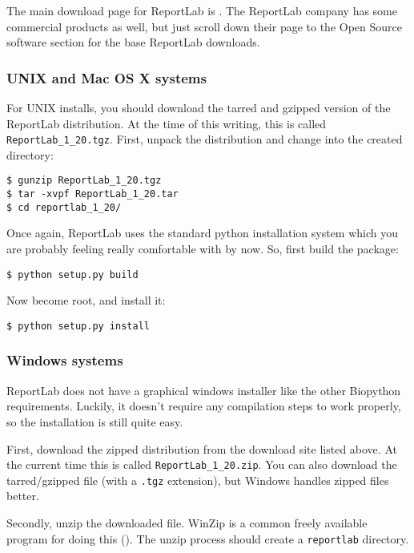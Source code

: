 \documentclass{article}
\begin{document}
The main download page for ReportLab is
. The ReportLab
company has some commercial products as well, but just scroll down their
page to the Open Source software section for the base ReportLab
downloads.

\subsubsection{UNIX and Mac OS X systems}

For UNIX installs, you should download the tarred and gzipped version of
the ReportLab distribution. At the time of this writing, this is called
\verb|ReportLab_1_20.tgz|. First, unpack the distribution and change
into the created directory:

\begin{verbatim}
$ gunzip ReportLab_1_20.tgz 
$ tar -xvpf ReportLab_1_20.tar
$ cd reportlab_1_20/
\end{verbatim}

Once again, ReportLab uses the standard python installation system which
you are probably feeling really comfortable with by now. So, first build
the package:

\begin{verbatim}
$ python setup.py build
\end{verbatim}

Now become root, and install it:

\begin{verbatim}
$ python setup.py install
\end{verbatim}

\subsubsection{Windows systems}

ReportLab does not have a graphical windows installer like the other
Biopython requirements. Luckily, it doesn't require any compilation
steps to work properly, so the installation is still quite easy. 

First, download the zipped distribution from the download site listed
above. At the current time this is called \verb|ReportLab_1_20.zip|. You
can also download the tarred/gzipped file (with a \verb|.tgz|
extension), but Windows handles zipped files better.

Secondly, unzip the downloaded file. WinZip is a common freely available
program for doing this
(). The unzip process
should create a \verb|reportlab| directory.
\end{document}
